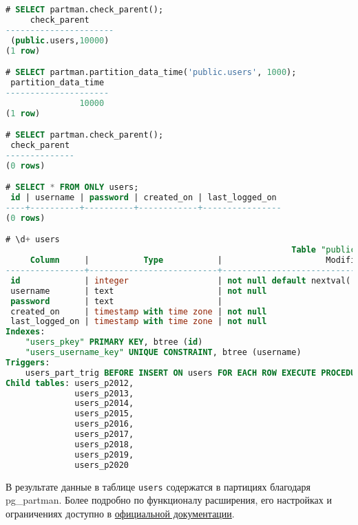 \begin{lstlisting}[language=SQL,label=lst:pgpartman7,caption=Перенос данных в партиции]
# SELECT partman.check_parent();
     check_parent
----------------------
 (public.users,10000)
(1 row)

# SELECT partman.partition_data_time('public.users', 1000);
 partition_data_time
---------------------
               10000
(1 row)

# SELECT partman.check_parent();
 check_parent
--------------
(0 rows)

# SELECT * FROM ONLY users;
 id | username | password | created_on | last_logged_on
----+----------+----------+------------+----------------
(0 rows)

# \d+ users
                                                          Table "public.users"
     Column     |           Type           |                     Modifiers                      | Storage  | Stats target | Description
----------------+--------------------------+----------------------------------------------------+----------+--------------+-------------
 id             | integer                  | not null default nextval('users_id_seq'::regclass) | plain    |              |
 username       | text                     | not null                                           | extended |              |
 password       | text                     |                                                    | extended |              |
 created_on     | timestamp with time zone | not null                                           | plain    |              |
 last_logged_on | timestamp with time zone | not null                                           | plain    |              |
Indexes:
    "users_pkey" PRIMARY KEY, btree (id)
    "users_username_key" UNIQUE CONSTRAINT, btree (username)
Triggers:
    users_part_trig BEFORE INSERT ON users FOR EACH ROW EXECUTE PROCEDURE users_part_trig_func()
Child tables: users_p2012,
              users_p2013,
              users_p2014,
              users_p2015,
              users_p2016,
              users_p2017,
              users_p2018,
              users_p2019,
              users_p2020
\end{lstlisting}


В результате данные в таблице \lstinline!users! содержатся в партициях благодаря pg\_partman. Более подробно по функционалу расширения, его настройках и ограничениях доступно в \href{https://github.com/keithf4/pg\_partman/blob/master/doc/pg\_partman.md}{официальной документации}.
